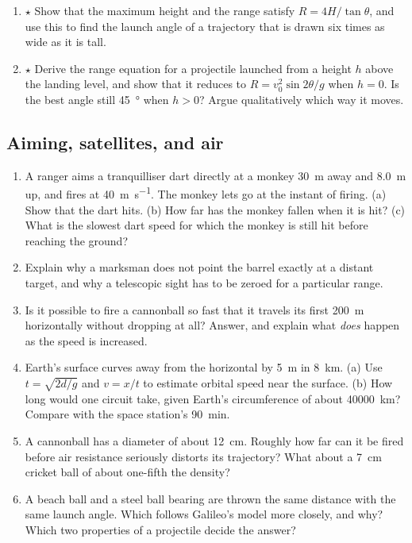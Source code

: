 \documentclass[11pt,twoside,openany]{book}
\begin{document}
\begin{enumerate}[label=\textbf{\thechapter.\arabic*},resume=exercises,leftmargin=*]
  \item $\star$ Show that the maximum height and the range satisfy $R = 4H/\tan\theta$, and use this to find the launch angle of a trajectory that is drawn six times as wide as it is tall.
  \item $\star$ Derive the range equation for a projectile launched from a height $h$ above the landing level, and show that it reduces to $R = v_0^2\sin2\theta/g$ when $h = 0$. Is the best angle still \SI{45}{\degree} when $h > 0$? Argue qualitatively which way it moves.
\end{enumerate}

\subsection*{Aiming, satellites, and air}
\begin{enumerate}[label=\textbf{\thechapter.\arabic*},resume=exercises,leftmargin=*]
  \item A ranger aims a tranquilliser dart directly at a monkey \SI{30}{\metre} away and \SI{8.0}{\metre} up, and fires at \SI{40}{\metre\per\second}. The monkey lets go at the instant of firing. (a) Show that the dart hits. (b) How far has the monkey fallen when it is hit? (c) What is the slowest dart speed for which the monkey is still hit before reaching the ground?
  \item Explain why a marksman does not point the barrel exactly at a distant target, and why a telescopic sight has to be zeroed for a particular range.
  \item Is it possible to fire a cannonball so fast that it travels its first \SI{200}{\metre} horizontally without dropping at all? Answer, and explain what \emph{does} happen as the speed is increased.
  \item Earth's surface curves away from the horizontal by \SI{5}{\metre} in \SI{8}{\kilo\metre}. (a) Use $t = \sqrt{2d/g}$ and $v = x/t$ to estimate orbital speed near the surface. (b) How long would one circuit take, given Earth's circumference of about \SI{40000}{\kilo\metre}? Compare with the space station's \SI{90}{\minute}.
  \item A cannonball has a diameter of about \SI{12}{\centi\metre}. Roughly how far can it be fired before air resistance seriously distorts its trajectory? What about a \SI{7}{\centi\metre} cricket ball of about one-fifth the density?
  \item A beach ball and a steel ball bearing are thrown the same distance with the same launch angle. Which follows Galileo's model more closely, and why? Which two properties of a projectile decide the answer?

\end{enumerate}
\end{document}

